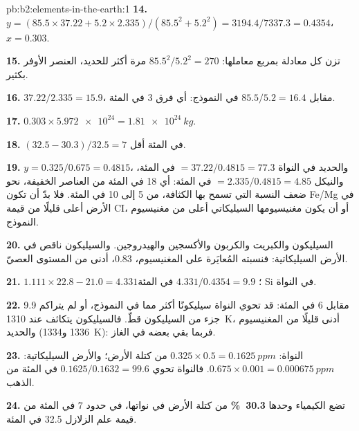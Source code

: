 \begin{solution}{pb:b2:elements-in-the-earth:1}
\textbf{14.} $y = (85.5\times37.22 + 5.2\times2.335)/(85.5^2 + 5.2^2) =
3194.4/7337.3 = 0.4354$، $x = 0.303$.

\textbf{15.} تزن كل معادلة بمربع معاملها: $85.5^2/5.2^2 = 270$
مرة أكثر للحديد، العنصر الأوفر بكثير.

\textbf{16.} $37.22/2.335 = 15.9$، مقابل $85.5/5.2 = 16.4$ في النموذج: أي فرق
3 في المئة.

\textbf{17.} $0.303\times\num{5.972e24} = \qty{1.81e24}{kg}$.

\textbf{18.} $(32.5-30.3)/32.5 = 7$ في المئة أقل.

\textbf{19.} $y = 0.325/0.675 = 0.4815$، والحديد في النواة $= 37.22/0.4815 = 77.3$ في المئة،
والنيكل $= 2.335/0.4815 = 4.85$ في المئة: أي 18 في المئة من العناصر الخفيفة، نحو ضعف النسبة التي تسمح بها الكثافة، من 5 إلى
10 في المئة. فلا بدّ أن تكون Fe/Mg في الأرض أعلى قليلًا من قيمة CI،
أو أن يكون مغنيسيومها السيليكاتي أعلى من مغنيسيوم النموذج.

\textbf{20.} السيليكون والكبريت والكربون والأكسجين والهيدروجين. والسيليكون ناقص في
الأرض السيليكاتية: فنسبته المُعايَرة على المغنيسيوم، 0.83، أدنى من المستوى العصيّ.

\textbf{21.} $1.111\times22.8 - 21.0 = 4.331$؛ $4.331/0.4354 = 9.9$ في المئة Si في
النواة.

\textbf{22.} 9.9 مقابل 6 في المئة: قد تحوي النواة سيليكونًا أكثر مما في النموذج، أو
لم يتراكم جزء من السيليكون قطّ. فالسيليكون يتكاثف عند \qty{1310}{K}، أدنى قليلًا
من المغنيسيوم والحديد (1336 و\qty{1334}{K}): فربما بقي بعضه في الغاز.

\textbf{23.} النواة: $0.325\times0.5 = \qty{0.1625}{ppm}$ من كتلة الأرض؛ والأرض
السيليكاتية: $0.675\times0.001 = \qty{0.000675}{ppm}$. فالنواة تحوي
$0.1625/0.1632 = 99.6$ في المئة من الذهب.

\textbf{24.} تضع الكيمياء وحدها
\textbf{\qty[text-series-to-math=true]{30.3}{\percent}} من كتلة الأرض في نواتها،
في حدود 7 في المئة من قيمة علم الزلازل 32.5 في المئة.
\end{solution}
